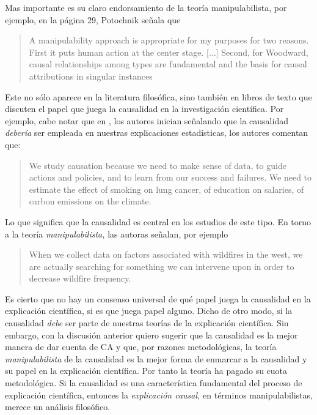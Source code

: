 Mas importante es su claro endorsamiento de la teoría
manipulabilista, por ejemplo, en la página 29, Potochnik
señala que 


\begin{quote}
  A manipulability approach is appropriate for my purposes for
  two reasons. First it puts human action at the center stage.
  [$\ldots$] Second, for Woodward, causal relationships among
  types are fundamental and the basis for causal attributions
  in singular instances \parencite[p.~29]{Potochnik2017-POTIAT-3}
\end{quote}

Este  no sólo aparece
en la literatura filosófica, sino también en libros de texto
que discuten el papel que juega la causalidad en la
investigación científica. Por ejemplo, cabe notar que en
\parencite{Pearl2016}, los autores  inician señalando que la
causalidad \emph{debería} ser empleada en nuestras
explicaciones estadísticas, los autores comentan que:

	\begin{quote}
    We study causation because we need to make sense of
    data, to guide actions and policies, and to learn from
    our success and failures. We need to estimate the effect
    of smoking on lung cancer, of education on salaries, of
    carbon emissions on the climate.
    \parencite[p.~1]{Pearl2016}
	\end{quote}

Lo que significa que la causalidad es central en
los estudios de este tipo. En torno a la teoría
\emph{manipulabilista,} las autoras señalan, por ejemplo

	\begin{quote}
	  When we collect data on factors associated with
    wildfires in the west, we are actually searching for
    something we can intervene upon in order to decrease
    wildfire frequency. \parencite[p.~53]{Pearl2016}
	\end{quote}

Es cierto que no hay un consenso universal de qué papel
juega la causalidad en la explicación científica, si es que
juega papel alguno. Dicho de otro modo, si la causalidad
\emph{debe} ser parte de nuestras teorías de la
explicación científica. Sin embargo, con la discusión
anterior quiero sugerir que la causalidad es la mejor manera
de dar cuenta de CA y que, por razones metodológicas, la
teoría \emph{manipulabilista} de la causalidad es la mejor
forma de enmarcar a la causalidad y su papel en la
explicación científica. Por tanto la teoría ha pagado su
cuota metodológica. Si la causalidad es una característica
fundamental del proceso de explicación científica, entonces
la \emph{explicación causal,} en términos manipulabilistas,
merece un análisis filosófico.

